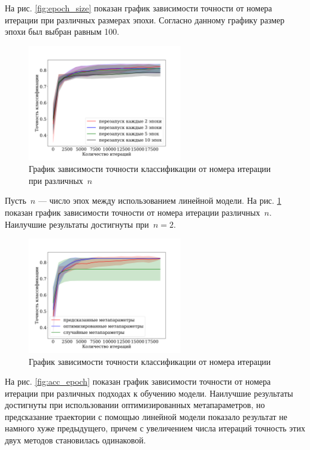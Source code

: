 \documentclass[12pt, twoside]{article}
\begin{document}
На рис. \ref{fig:epoch_size} показан график зависимости точности от номера итерации при различных размерах эпохи. Согласно данному графику размер эпохи был выбран равным 100.

\begin{figure}[!ht]
\centering
\includegraphics[width=0.6\textwidth]{linear_train_splines_every_epoch.pdf}
\caption{График зависимости точности классификации от номера итерации при различных~$n$}
\label{fig:train_splines_every_epoch}
\end{figure}

Пусть~$n$ --- число эпох между использованием линейной модели. На рис. \ref{fig:train_splines_every_epoch} показан график зависимости точности от номера итерации различных~$n$. Наилучшие результаты достигнуты при~$n=2$.

\begin{figure}[!ht]
\centering
\includegraphics[width=0.6\textwidth]{acc_iter.pdf}
\caption{График зависимости точности классификации от номера итерации}
\label{fig:acc_iter}
\end{figure}

На рис. \ref{fig:acc_epoch} показан график зависимости точности от номера итерации при различных подходах к обучению модели. Наилучшие результаты достигнуты при использовании оптимизированных метапараметров, но предсказание траектории с помощью линейной модели показало результат не намного хуже предыдущего, причем с увеличением числа итераций точность этих двух методов становилась одинаковой.
\end{document}
